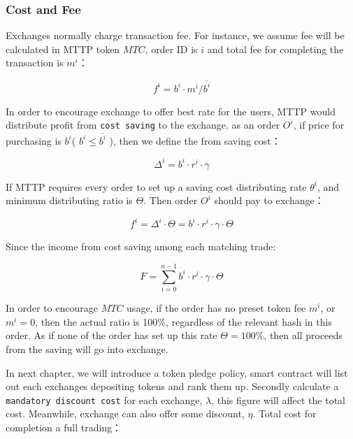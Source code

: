 \documentclass[UTF8,nofonts]{article}
\begin{document}
\subsubsection{Cost and Fee\label{sec: fee}}

Exchanges normally charge transaction fee. For instance,  we assume fee will be calculated in MTTP token $MTC$, order ID is $i$ and total fee for completing the transaction is $m^i$：

\begin{equation*}
f^i = b^i \cdot m^i / \overline{b^i}
\end{equation*}


In order to encourage exchange to offer best rate for the users,  MTTP would distribute profit from \texttt{cost saving} to the exchange. as an order $O^i$,  if price for purchasing is $b^i$( $b^i \le \overline{b^i}$ ),  then we define the from saving cost：

\begin{equation*}
\Delta^i = b^i \cdot r^i \cdot \gamma
\end{equation*}

If MTTP requires every order to set up a saving cost distributing rate $\theta^i$, and minimum distributing ratio is $\Theta$. Then order $O^i$ should pay to exchange：


\begin{equation*}
f^i = \Delta^i \cdot \Theta = b^i \cdot r^i \cdot \gamma \cdot \Theta
\end{equation*}

Since the income from cost saving among each matching trade:

\begin{equation*}
F = \sum^{n-1}_{i=0} b^i \cdot r^i \cdot \gamma \cdot \Theta
\end{equation*}

In order to encourage $MTC$ usage,  if the order has no preset token fee $m^i$, or $m^i=0$, then the actual ratio is 100\%,  regardless of the relevant hash in this order. As if none of the order has set up this rate $\Theta=100\%$,  then all proceeds from the saving will go into exchange.

In next chapter,  we will introduce a token pledge policy,  smart contract will list out each exchanges depositing tokens and rank them up. Secondly calculate a \texttt{mandatory discount cost} for each exchange, $\lambda$, this figure will affect the total cost. Meanwhile, exchange can also offer some discount, $\eta$. Total cost for completion a full trading：
\end{document}
